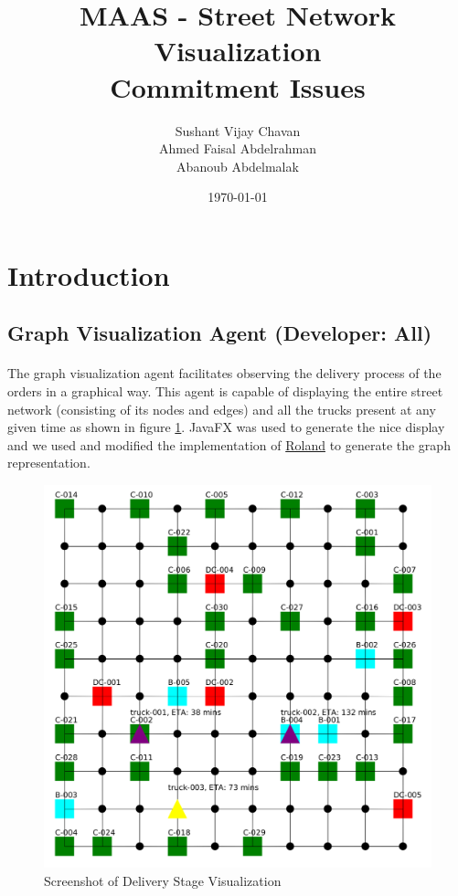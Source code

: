 \documentclass[11pt, a4paper]{article}
\title{MAAS - Street Network Visualization \\Commitment Issues}
\author{Sushant Vijay Chavan\\Ahmed Faisal Abdelrahman\\Abanoub Abdelmalak}
\date{\today}
\begin{document}
\maketitle
\newpage
\tableofcontents{}
\newpage

\section{Introduction}
\paragraph{}


\newpage
\subsection{Graph Visualization Agent (Developer: All)}\label{GraphVisualizationAgent}
\paragraph{}
The graph visualization agent facilitates observing the delivery process of the orders in a graphical way. This agent is capable of displaying the entire street network (consisting of its nodes and edges) and all the trucks present at any given time as shown in figure \ref{VisualizationScreenshot}. JavaFX was used to generate the nice display and we used and modified the implementation of \href{https://stackoverflow.com/a/30696075}{Roland} to generate the graph representation.

\begin{figure}[h!]
	\centering
	\includegraphics[width=\textwidth]{Visualization.png}
	\caption{Screenshot of Delivery Stage Visualization}
	\label{VisualizationScreenshot}
\end{figure}
\end{document}
